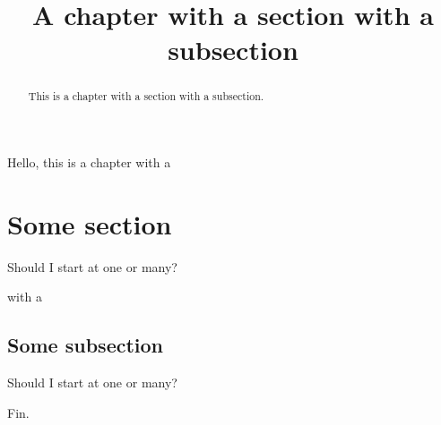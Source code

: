 \documentclass{ximera}
\title{A chapter with a section with a subsection}
\begin{document}
\begin{abstract}
  This is a chapter with a section with a subsection.
\end{abstract}
\maketitle




Hello, this is a chapter with a

\section{Some section}


\begin{theorem}
  Should I start at one or many?
\end{theorem}
with a

\subsection{Some subsection}

\begin{theorem}
  Should I start at one or many?
\end{theorem}



Fin.
\end{document}

